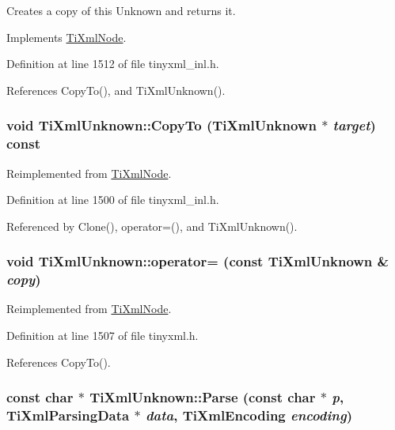 Creates a copy of this Unknown and returns it. 

Implements \hyperlink{class_ti_xml_node_a4508cc3a2d7a98e96a54cc09c37a78a4}{TiXmlNode}.

Definition at line 1512 of file tinyxml\_\-inl.h.

References CopyTo(), and TiXmlUnknown().\hypertarget{class_ti_xml_unknown_a08ca7b225a2bcb604d3c72e199d33408}{
\subsubsection[{CopyTo}]{\setlength{\rightskip}{0pt plus 5cm}void TiXmlUnknown::CopyTo ({\bf TiXmlUnknown} $\ast$ {\em target}) const}}
\label{class_ti_xml_unknown_a08ca7b225a2bcb604d3c72e199d33408}


Reimplemented from \hyperlink{class_ti_xml_node_ab6056978923ad8350fb5164af32d8038}{TiXmlNode}.

Definition at line 1500 of file tinyxml\_\-inl.h.

Referenced by Clone(), operator=(), and TiXmlUnknown().\hypertarget{class_ti_xml_unknown_a5097fe228cd5ad4edcdddf02c334fd83}{
\subsubsection[{operator=}]{\setlength{\rightskip}{0pt plus 5cm}void TiXmlUnknown::operator= (const {\bf TiXmlUnknown} \& {\em copy})}}
\label{class_ti_xml_unknown_a5097fe228cd5ad4edcdddf02c334fd83}


Reimplemented from \hyperlink{class_ti_xml_node_a9eb62a8d95b8a98ec2df481cc9e5a7e2}{TiXmlNode}.

Definition at line 1507 of file tinyxml.h.

References CopyTo().\hypertarget{class_ti_xml_unknown_aa51c2694e4177b5f0b5429ee5a81b58d}{
\subsubsection[{Parse}]{\setlength{\rightskip}{0pt plus 5cm}const char $\ast$ TiXmlUnknown::Parse (const char $\ast$ {\em p}, \/  {\bf TiXmlParsingData} $\ast$ {\em data}, \/  {\bf TiXmlEncoding} {\em encoding})}}
\label{class_ti_xml_unknown_aa51c2694e4177b5f0b5429ee5a81b58d}



